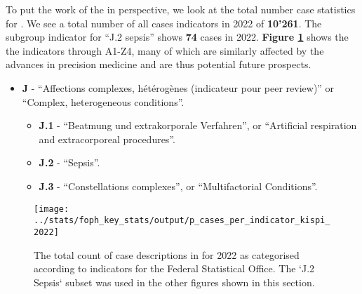 To put the work of the \pmu in perspective, we look at the total number case statistics for \kispi.
We see a total number of all cases indicators in 2022 of \textbf{10'261}.
The subgroup indicator for ``J.2 sepsis'' shows \textbf{74} cases in 2022.
\textbf{Figure \ref{fig:p_cases_per_indicator_kispi_2022}}  shows the the indicators through A1-Z4, many of which are similarly affected by the advances in precision medicine and are thus potential future prospects.

\begin{itemize}
\item \textbf{J} - ``Affections complexes, hétérogènes (indicateur pour peer review)'' or ``Complex, heterogeneous conditions''.
\begin{itemize}
	\item  \textbf{J.1} - ``Beatmung und extrakorporale Verfahren'', or ``Artificial respiration and extracorporeal procedures''.
	\item  \textbf{J.2} - ``Sepsis''.
	\item  \textbf{J.3} - ``Constellations complexes'', or ``Multifactorial Conditions''.
\end{itemize}
\end{itemize}

\begin{figure}[h] \hspace*{0cm} 
\begin{center}
	\texttt{[image: ../stats/foph\_key\_stats/output/p\_cases\_per\_indicator\_kispi\_2022]}
	\caption{The total count of case descriptions in \kispi for 2022 as categorised according to indicators for the Federal Statistical Office. 
	The `J.2 Sepsis` subset was used in the other figures shown in this section.}
	\label{fig:p_cases_per_indicator_kispi_2022}
\end{center}
\end{figure}

\clearpage